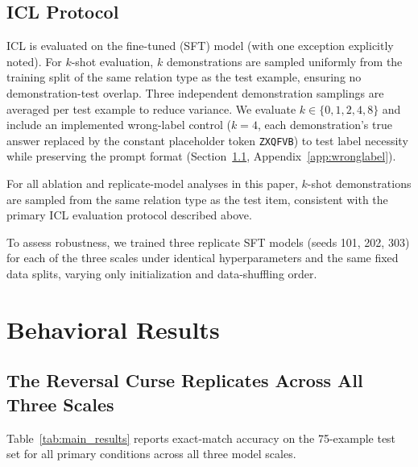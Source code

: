 \documentclass[11pt]{article}
\begin{document}
\subsection{ICL Protocol}

ICL is evaluated on the fine-tuned (SFT) model (with one exception explicitly
noted). For $k$-shot evaluation, $k$ demonstrations are sampled uniformly from
the training split of the same relation type as the test example, ensuring no
demonstration-test overlap. Three independent demonstration samplings are
averaged per test example to reduce variance. We evaluate $k \in \{0, 1, 2, 4,
8\}$ and include an implemented wrong-label control ($k=4$, each
demonstration's true answer replaced by the constant placeholder token
\texttt{ZXQFVB}) to test label necessity while preserving the prompt format
(Section~\ref{sec:main_behavioral}, Appendix~\ref{app:wronglabel}).

For all ablation and replicate-model analyses in this paper, $k$-shot
demonstrations are sampled from the same relation type as the test item,
consistent with the primary ICL evaluation protocol described above.

To assess robustness, we trained three replicate SFT models (seeds 101, 202,
303) for each of the three scales under identical hyperparameters and the same
fixed data splits, varying only initialization and data-shuffling order.

\section{Behavioral Results}
\label{sec:behavioral}

\subsection{The Reversal Curse Replicates Across All Three Scales}
\label{sec:main_behavioral}

Table~\ref{tab:main_results} reports exact-match accuracy on the 75-example
test set for all primary conditions across all three model scales.
\end{document}
